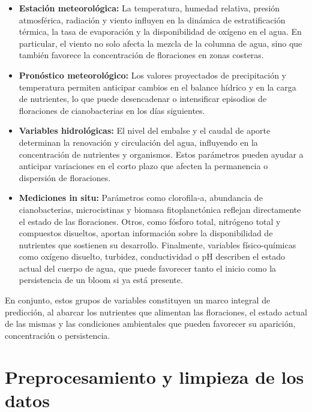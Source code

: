 \documentclass[
  11pt,
  pdftitle=TFI - Tschopp Joaquín S.,
  pdfauthor=Tschopp Joaquín S.,
  pdfcreator=LaTeX with hyperref,
]{report}  %
\begin{document}
\begin{itemize}
    \item \textbf{Estación meteorológica:} La temperatura, humedad relativa, presión atmosférica, radiación y viento influyen en la dinámica de estratificación térmica, la tasa de evaporación y la disponibilidad de oxígeno en el agua. En particular, el viento no solo afecta la mezcla de la columna de agua, sino que también favorece la concentración de floraciones en zonas costeras.
    
    \item \textbf{Pronóstico meteorológico:} Los valores proyectados de precipitación y temperatura permiten anticipar cambios en el balance hídrico y en la carga de nutrientes, lo que puede desencadenar o intensificar episodios de floraciones de cianobacterias en los días siguientes.
    
    \item \textbf{Variables hidrológicas:} El nivel del embalse y el caudal de aporte determinan la renovación y circulación del agua, influyendo en la concentración de nutrientes y organismos. Estos parámetros pueden ayudar a anticipar variaciones en el corto plazo que afecten la permanencia o dispersión de floraciones.
    
    \item \textbf{Mediciones in situ:} Parámetros como clorofila-a, abundancia de cianobacterias, microcistinas y biomasa fitoplanctónica reflejan directamente el estado de las floraciones. Otros, como fósforo total, nitrógeno total y compuestos disueltos, aportan información sobre la disponibilidad de nutrientes que sostienen su desarrollo. Finalmente, variables físico-químicas como oxígeno disuelto, turbidez, conductividad o pH describen el estado actual del cuerpo de agua, que puede favorecer tanto el inicio como la persistencia de un bloom si ya está presente.
\end{itemize}

En conjunto, estos grupos de variables constituyen un marco integral de predicción, al abarcar los nutrientes que alimentan las floraciones, el estado actual de las mismas y las condiciones ambientales que pueden favorecer su aparición, concentración o persistencia.



\section{Preprocesamiento y limpieza de los datos}
\end{document}
